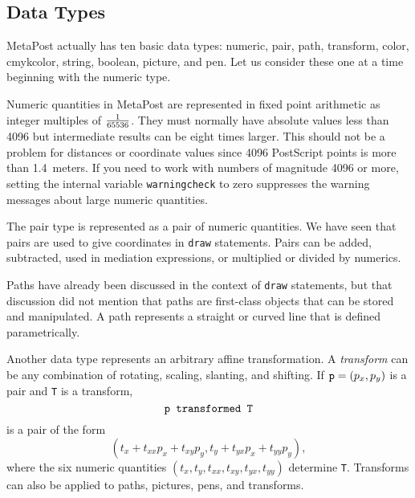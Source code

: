 \documentclass{article} %
\begin{document}
\subsection{Data Types}

MetaPost actually has ten basic data types: numeric,
pair, path, transform, color, cmykcolor, string, boolean, picture, and
pen.  Let us consider these one at a time beginning with the numeric
type.

Numeric quantities in MetaPost are represented in fixed
point arithmetic as
integer multiples of $1\over65536$.  They must normally have absolute values
less than 4096 but intermediate results can be eight times larger.
This should not be a problem for distances or coordinate values since 4096
PostScript points is more than 1.4~meters.  If you need to work with numbers
of magnitude 4096 or more, setting the internal variable
{\tt warningcheck}\label{Dwarncheck} to zero
suppresses the warning messages about large numeric quantities.

The pair type is represented as a pair of numeric
quantities.  We have seen that pairs are used to give coordinates in
{\tt draw} statements.  Pairs can be added, subtracted, used in
mediation expressions, or multiplied or divided by numerics.

Paths have already been discussed in the context of {\tt draw}
statements, but
that discussion did not mention that paths are first-class objects that can be
stored and manipulated.  A path represents a straight or curved line that is
defined parametrically.

Another data type represents an arbitrary affine
transformation.  A {\em transform\/} can be any
combination of rotating, scaling, slanting, and shifting.  If ${\tt
p}=(p_x,p_y)$ is a pair and {\tt T} is a
transform,
$$ \hbox{\tt p transformed T} $$
is a pair of the form
$$ (t_x+t_{xx}p_x+t_{xy}p_y, t_y+t_{yx}p_x+t_{yy}p_y), $$
where the six numeric quantities $(t_x,t_y,t_{xx},t_{xy},t_{yx},t_{yy})$
determine {\tt T}.  Transforms can also be applied to paths, pictures, pens,
and transforms.
\end{document}
